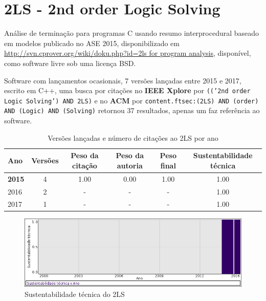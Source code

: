
%

\label{softwares-summary}

\section{2LS - 2nd order Logic Solving}

Análise de terminação para programas C usando resumo interprocedural baseado em modelos
publicado no ASE 2015,
disponibilizado em \url{http://svn.cprover.org/wiki/doku.php?id=2ls for program analysis},
disponível,
como software livre
sob uma licença BSD.

Software com lançamentos ocasionais,
7 versões lançadas
entre 2015 e 2017,
escrito em C++,
uma busca por citações no {\bf IEEE Xplore} por
\texttt{(('2nd order Logic Solving') AND 2LS)}
e no {\bf ACM} por
\texttt{content.ftsec:(2LS) AND (order) AND (Logic) AND (Solving)}
retornou
37 resultados,
apenas um faz referência ao software.


\begin{table}[H]
\caption{Versões lançadas e número de citações ao 2LS por ano}
\centering
\begin{tabular}{| l | c | c | c | c | c |}
  \hline
  Ano & Versões & Peso da citação & Peso da autoria & Peso final & Sustentabilidade técnica \\
  \hline
            {\bf 2015}
          &
          4
          &
          1.00
          &
          0.00
          &
          1.00
          &
            {\color{blue} 1.00}
          \\
\hline
        2016 & 2 & - & - & -
        &
          {\color{blue} 1.00}
        \\
\hline
        2017 & 1 & - & - & -
        &
          {\color{blue} 1.00}
        \\
\hline
\end{tabular}
\end{table}

\begin{figure}[h]
  \center
  \includegraphics[scale=0.50]{imagens/softwares-charts/2ls.png}
  \caption{Sustentabilidade técnica do 2LS}
\end{figure}


